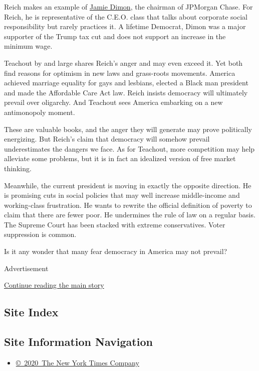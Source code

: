 Reich makes an example of
\href{https://institute.jpmorganchase.com/about/our-leadership/jamie-dimon}{Jamie
Dimon}, the chairman of JPMorgan Chase. For Reich, he is representative
of the C.E.O. class that talks about corporate social responsibility but
rarely practices it. A lifetime Democrat, Dimon was a major supporter of
the Trump tax cut and does not support an increase in the minimum wage.

Teachout by and large shares Reich's anger and may even exceed it. Yet
both find reasons for optimism in new laws and grass-roots movements.
America achieved marriage equality for gays and lesbians, elected a
Black man president and made the Affordable Care Act law. Reich insists
democracy will ultimately prevail over oligarchy. And Teachout sees
America embarking on a new antimonopoly moment.

These are valuable books, and the anger they will generate may prove
politically energizing. But Reich's claim that democracy will somehow
prevail underestimates the dangers we face. As for Teachout, more
competition may help alleviate some problems, but it is in fact an
idealized version of free market thinking.

Meanwhile, the current president is moving in exactly the opposite
direction. He is promising cuts in social policies that may well
increase middle-income and working-class frustration. He wants to
rewrite the official definition of poverty to claim that there are fewer
poor. He undermines the rule of law on a regular basis. The Supreme
Court has been stacked with extreme conservatives. Voter suppression is
common.

Is it any wonder that many fear democracy in America may not prevail?

Advertisement

\protect\hyperlink{after-bottom}{Continue reading the main story}

\hypertarget{site-index}{%
\subsection{Site Index}\label{site-index}}

\hypertarget{site-information-navigation}{%
\subsection{Site Information
Navigation}\label{site-information-navigation}}

\begin{itemize}
\tightlist
\item
  \href{https://help.nytimes3xbfgragh.onion/hc/en-us/articles/115014792127-Copyright-notice}{©~2020~The
  New York Times Company}
\end{itemize}


